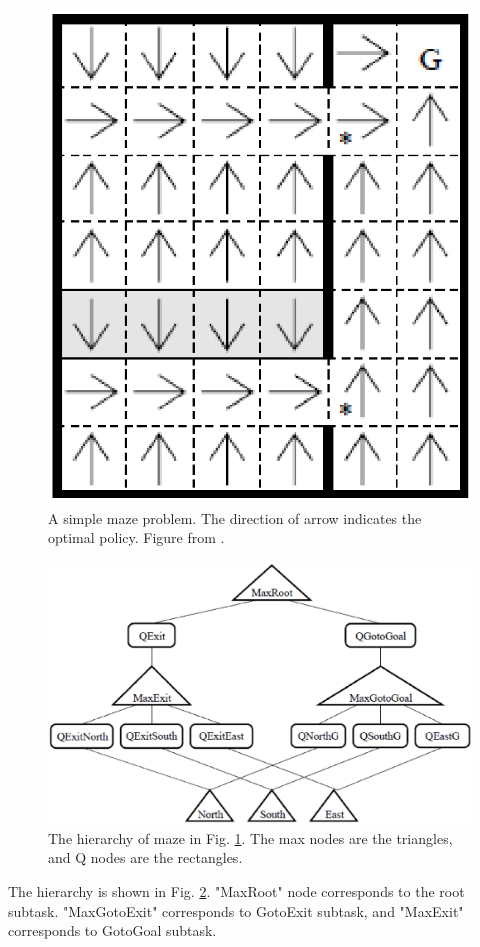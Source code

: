 \begin{figure}[h]
    \centering
    \begin{minipage}[t]{0.4\linewidth}
        \centering
        \includegraphics[width=\textwidth] {./figures/Maze.eps}
    \end{minipage}
    \caption{A simple maze problem. The direction of arrow indicates the optimal policy. Figure from \cite{MaxQJ}.}
    \label{fig:Maze}
\end{figure}
\begin{figure}[h]
    \centering
    \begin{minipage}[t]{0.8\linewidth}
        \centering
        \includegraphics[width=\textwidth] {./figures/MazeH.eps}
    \end{minipage}
    \caption{The hierarchy of maze in Fig. \ref{fig:Maze}. The max nodes are the triangles, and Q nodes are the rectangles. }
    \label{fig:MazeH}
\end{figure}
The hierarchy is shown in Fig. \ref{fig:MazeH}.
"MaxRoot" node corresponds to the root subtask. "MaxGotoExit" corresponds to GotoExit subtask,
and "MaxExit" corresponds to GotoGoal subtask.

